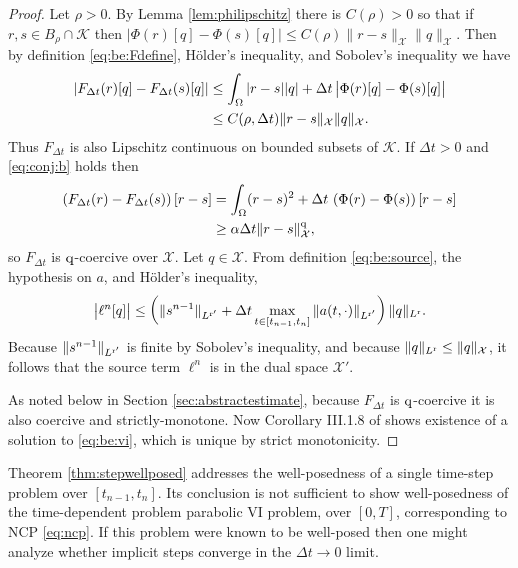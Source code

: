 \documentclass[hidelinks,onefignum,onetabnum,final]{siamart220329}  %
\newcommand{\cK}{\mathcal{K}}
\newcommand{\cX}{\mathcal{X}}
\newcommand{\qq}{{\text{\textnormal{q}}}}
\newcommand{\rr}{{\text{\textnormal{r}}}}
\begin{document}
\begin{proof}  Let $\rho>0$.  By Lemma \ref{lem:philipschitz} there is $C(\rho)>0$ so that if $r,s\in B_\rho\cap\cK$ then $\big|\Phi(r)[q] - \Phi(s)[q]\big| \le C(\rho) \|r-s\|_{\cX} \|q\|_{\cX}$.  Then by definition \eqref{eq:be:Fdefine}, H\"older's inequality, and Sobolev's inequality we have
\begin{align}
\left|F_{\Delta t}(r)[q] - F_{\Delta t}(s)[q]\right| &\le \int_\Omega |r-s||q| + \Delta t\, \big|\Phi(r)[q] - \Phi(s)[q]\big| \\
    &\le C(\rho,\Delta t) \|r-s\|_{\cX} \|q\|_\cX. \notag
\end{align}
Thus $F_{\Delta t}$ is also Lipschitz continuous on bounded subsets of $\cK$.  If $\Delta t>0$ and \eqref{eq:conj:b} holds then
\begin{align}
\left(F_{\Delta t}(r) - F_{\Delta t}(s)\right)[r-s] &= \int_\Omega (r-s)^2 + \Delta t\, \left(\Phi(r) - \Phi(s)\right)[r-s] \\
    &\ge \alpha\Delta t \|r-s\|_{\cX}^\qq, \notag
\end{align}
so $F_{\Delta t}$ is $\qq$-coercive over $\cX$.  Let $q\in\cX$.  From definition \eqref{eq:be:source}, the hypothesis on $a$, and H\"older's inequality,
\begin{equation}
\big|\ell^n[q]\big| \le \left(\|s^{n-1}\|_{L^{\rr'}} + \Delta t \max_{t\in[t_{n-1},t_n]} \|a(t,\cdot)\|_{L^{\rr'}}\right) \|q\|_{L^\rr}.
\label{eq:sourcetermbound}
\end{equation}
Because $\|s^{n-1}\|_{L^{\rr'}}$ is finite by Sobolev's inequality, and because $\|q\|_{L^\rr} \le \|q\|_{\cX}$, it follows that the source term $\ell^n$ is in the dual space $\cX'$.

As noted below in Section \ref{sec:abstractestimate}, because $F_{\Delta t}$ is $\qq$-coercive it is also coercive and strictly-monotone.  Now Corollary III.1.8 of \cite{KinderlehrerStampacchia1980} shows existence of a solution to \eqref{eq:be:vi}, which is unique by strict monotonicity.
\end{proof}

Theorem \ref{thm:stepwellposed} addresses the well-posedness of a single time-step problem over $[t_{n-1},t_n]$.  Its conclusion is not sufficient to show well-posedness of the time-dependent problem parabolic VI problem, over $[0,T]$, corresponding to NCP \eqref{eq:ncp}.  If this problem were known to be well-posed then one might analyze whether implicit steps converge in the $\Delta t\to 0$ limit.
\end{document}
